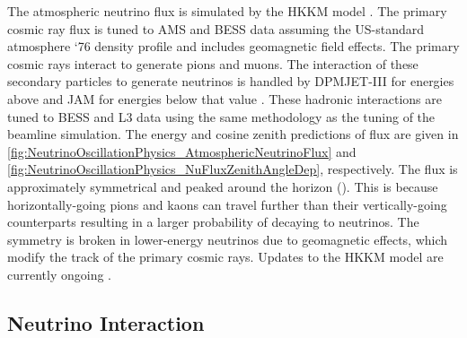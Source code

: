 The atmospheric neutrino flux is simulated by the HKKM model \cite{Honda_2007, Honda:2011}. The primary cosmic ray flux is tuned to AMS \cite{Blau2002} and BESS \cite{Haino2004} data assuming the US-standard atmosphere `76 \cite{USStandardAtm} density profile and includes geomagnetic field effects. The primary cosmic rays interact to generate pions and muons. The interaction of these secondary particles to generate neutrinos is handled by DPMJET-III \cite{Roesler2001} for energies above  and JAM \cite{Niita2006, Honda:2011} for energies below that value \cite{Gaisser2002-gl}. These hadronic interactions are tuned to BESS and L3 data \cite{Sanuki_2002, Achard_2004} using the same methodology as the tuning of the beamline simulation. The energy and cosine zenith predictions of  flux are given in \autoref{fig:NeutrinoOscillationPhysics_AtmosphericNeutrinoFlux} and \autoref{fig:NeutrinoOscillationPhysics_NuFluxZenithAngleDep}, respectively. The flux is approximately symmetrical and peaked around the horizon (). This is because horizontally-going pions and kaons can travel further than their vertically-going counterparts resulting in a larger probability of decaying to neutrinos. The symmetry is broken in lower-energy neutrinos due to geomagnetic effects, which modify the track of the primary cosmic rays. Updates to the HKKM model are currently ongoing \cite{Sato2022-ss}.

\subsection{Neutrino Interaction}

